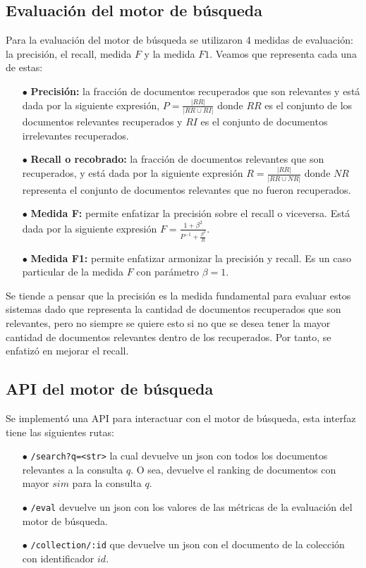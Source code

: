 \subsection{Evaluación del motor de búsqueda}

Para la evaluación del motor de búsqueda se utilizaron 4 medidas de evaluación: la precisión, el recall, medida $F$ y la medida $F1$. Veamos que representa cada una de estas:

\begin{enumerate}
    \item[$\bullet$] \textbf{Precisión:} la fracción de documentos recuperados que son relevantes y está dada por la siguiente expresión, $P = \frac{|RR|}{|RR \cup RI|}$ donde $RR$ es el conjunto de los documentos relevantes recuperados y $RI$ es el conjunto de documentos irrelevantes recuperados.
    \item[$\bullet$] \textbf{Recall o recobrado:} la fracción de documentos relevantes que son recuperados, y está dada por la siguiente expresión $R = \frac{|RR|}{|RR \cup NR|}$ donde $NR$ representa el conjunto de documentos relevantes que no fueron recuperados.
    \item[$\bullet$] \textbf{Medida F:} permite enfatizar la precisión sobre el recall o viceversa. Está dada por la siguiente expresión $F = \frac{1 + \beta^2}{P^{-1} + \frac{\beta^2}{R}}$.
    \item[$\bullet$] \textbf{Medida F1:} permite enfatizar armonizar la precisión y recall. Es un caso particular de la medida $F$ con parámetro $\beta = 1$. 
\end{enumerate}


Se tiende a pensar que la precisión es la medida fundamental para evaluar estos sistemas dado que representa la cantidad de documentos recuperados que son relevantes, pero no siempre se quiere esto si no que se desea tener la mayor cantidad de documentos relevantes dentro de los recuperados. Por tanto, se enfatizó en mejorar el recall.

\subsection{API del motor de búsqueda}

Se implementó una API para interactuar con el motor de búsqueda, esta interfaz tiene las siguientes rutas:

\begin{enumerate}
    \item[$\bullet$] \verb|/search?q=<str>| la cual devuelve un json con todos los documentos relevantes a la consulta $q$. O sea, devuelve el ranking de documentos con mayor $sim$ para la consulta $q$.
    \item[$\bullet$] \verb|/eval| devuelve un json con los valores de las métricas de la evaluación del motor de búsqueda.
    \item[$\bullet$] \verb|/collection/:id| que devuelve un json con el documento de la colección con identificador $id$.  
\end{enumerate}

